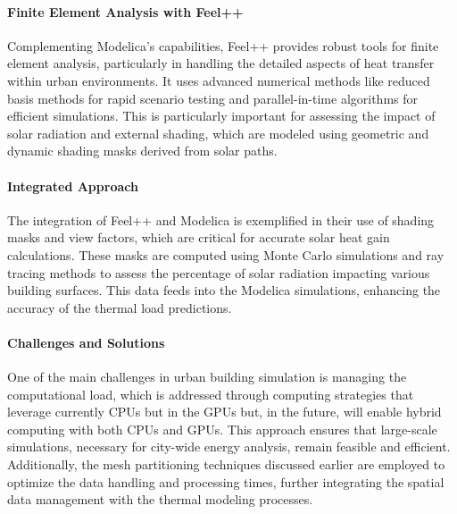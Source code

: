 \documentclass[runningheads]{llncs}
\begin{document}
\paragraph{Finite Element Analysis with Feel++}
Complementing Modelica's capabilities, Feel++ provides robust tools for finite element analysis, particularly in handling the detailed aspects of heat transfer within urban environments. It uses advanced numerical methods like reduced basis methods for rapid scenario testing and parallel-in-time algorithms for efficient simulations. This is particularly important for assessing the impact of solar radiation and external shading, which are modeled using geometric and dynamic shading masks derived from solar paths.

\paragraph{Integrated Approach}
The integration of Feel++ and Modelica is exemplified in their use of shading masks and view factors, which are critical for accurate solar heat gain calculations. These masks are computed using Monte Carlo simulations and ray tracing methods to assess the percentage of solar radiation impacting various building surfaces. This data feeds into the Modelica simulations, enhancing the accuracy of the thermal load predictions.

\paragraph{Challenges and Solutions}
One of the main challenges in urban building simulation is managing the computational load, which is addressed through computing strategies that leverage currently CPUs but in the GPUs but, in the future, will enable hybrid computing with both CPUs and GPUs. 
This approach ensures that large-scale simulations, necessary for city-wide energy analysis, remain feasible and efficient. 
Additionally, the mesh partitioning techniques discussed earlier are employed to optimize the data handling and processing times, further integrating the spatial data management with the thermal modeling processes.


\end{document}
